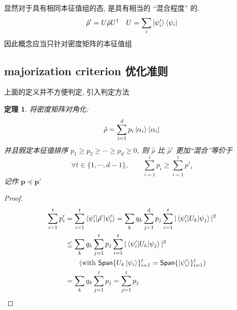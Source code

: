 \documentclass[12pt,a4paper]{article}
\renewcommand*{\vec}[1]{\bm{#1}}
\newcommand{\Span}{{\mathsf{Span}}}
\newtheorem{proof}{证明}
\newtheorem{theorem}{定理}
\begin{document}
    显然对于具有相同本征值组的态, 是具有相当的 ``混合程度'' 的. 
    $$
     \hat\rho' = U\hat\rho U^\dagger\quad U = \sum_i\ket{\psi_i'}\bra{\psi_i}
    $$
    因此概念应当只针对密度矩阵的本征值组

    \subsection{majorization criterion 优化准则}
    上面的定义并不方便判定, 引入判定方法
    \begin{theorem}
        将密度矩阵对角化:
        \begin{equation}
            \hat\rho = \sum_{i=1}^d p_{i}\ket{\alpha_{i}}\bra{\alpha_{i}} 
        \end{equation}
        并且假定本征值排序 $p_{1}\ge p_{2}\ge\cdots\ge p_{d}\ge 0$, 
        则 $\hat\rho$ 比 $\hat\rho'$ 更加``混合''等价于
        \begin{equation}
            \forall t\in\{1,\cdots,d-1\},\qquad \sum_{i=1}^t p_{i}\ge\sum_{i=1}^t p'_{i}
        \end{equation}
        记作 $\vec p \preceq \vec p'$
    \end{theorem}

    \begin{proof}
        \begin{align*}
            \sum_{i=1}^t p'_{i} &= \sum_{i=1}^t \braket{\psi'_i|\hat\rho'|\psi'_i} 
            = \sum_k q_k \sum_{j=1}^d p_j\sum_{i=1}^t |\braket{\psi'_i|U_k|\psi_j}|^2 \\
            &\le \sum_k q_k \sum_{j=1}^t p_j\sum_{i=1}^t|\braket{\psi'_i|U_k|\psi_j}|^2 \\
                &\qquad (\mbox{with }\Span\{U_k\ket{\psi_i}\}_{i=1}^t=\Span\{\ket{\psi'_i}\}_{i=1}^t) \\
            &= \sum_k q_k \sum_{j=1}^t p_j = \sum_{j=1}^t p_j
        \end{align*}
    \end{proof}
\end{document}
